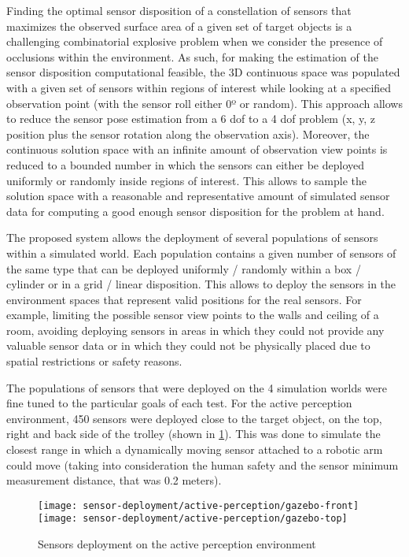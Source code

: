 Finding the optimal sensor disposition of a constellation of sensors that maximizes the observed surface area of a given set of target objects is a challenging combinatorial explosive problem when we consider the presence of occlusions within the environment. As such, for making the estimation of the sensor disposition computational feasible, the 3D continuous space was populated with a given set of sensors within regions of interest while looking at a specified observation point (with the sensor roll either 0º or random). This approach allows to reduce the sensor pose estimation from a 6 \gls{dof} to a 4 \gls{dof} problem (x, y, z position plus the sensor rotation along the observation axis). Moreover, the continuous solution space with an infinite amount of observation view points is reduced to a bounded number in which the sensors can either be deployed uniformly or randomly inside regions of interest. This allows to sample the solution space with a reasonable and representative amount of simulated sensor data for computing a good enough sensor disposition for the problem at hand.

The proposed system allows the deployment of several populations of sensors within a simulated world. Each population contains a given number of sensors of the same type that can be deployed uniformly / randomly within a box / cylinder or in a grid / linear disposition. This allows to deploy the sensors in the environment spaces that represent valid positions for the real sensors. For example, limiting the possible sensor view points to the walls and ceiling of a room, avoiding deploying sensors in areas in which they could not provide any valuable sensor data or in which they could not be physically placed due to spatial restrictions or safety reasons.

The populations of sensors that were deployed on the 4 simulation worlds were fine tuned to the particular goals of each test. For the active perception environment, 450 sensors were deployed close to the target object, on the top, right and back side of the trolley (shown in \cref{fig:sensors-deployment-active-perception-environment}). This was done to simulate the closest range in which a dynamically moving sensor attached to a robotic arm could move (taking into consideration the human safety and the sensor minimum measurement distance, that was 0.2 meters).

\begin{figure}
	\centering
	\texttt{[image: sensor-deployment/active-perception/gazebo-front]}\hspace{1em}
	\texttt{[image: sensor-deployment/active-perception/gazebo-top]}
	\caption{Sensors deployment on the active perception environment}
	\label{fig:sensors-deployment-active-perception-environment}
\end{figure}

